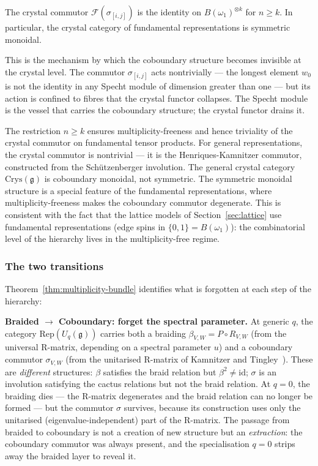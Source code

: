\begin{corollary}
\label{cor:crystal-trivial}
The crystal commutor $\mathcal{F}(\sigma_{[i,j]})$ is the identity on
$B(\omega_1)^{\otimes k}$ for $n \geq k$.  In particular, the crystal
category of fundamental representations is symmetric monoidal.
\end{corollary}

\noindent
This is the mechanism by which the coboundary structure becomes
invisible at the crystal level.  The commutor $\sigma_{[i,j]}$ acts
nontrivially --- the longest element $w_0$ is not the identity in
any Specht module of dimension greater than one --- but its action
is confined to fibres that the crystal functor collapses.  The Specht
module is the vessel that carries the coboundary structure; the crystal
functor drains it.

\begin{remark}
The restriction $n \geq k$ ensures multiplicity-freeness and hence
triviality of the crystal commutor on fundamental tensor products.
For general representations, the crystal commutor is nontrivial --- it
is the Henriques-Kamnitzer commutor, constructed from the
Sch\"utzenberger involution.  The general crystal category
$\mathrm{Crys}(\mathfrak{g})$ is coboundary monoidal, not symmetric.
The symmetric monoidal structure is a special feature of the
fundamental representations, where multiplicity-freeness makes the
coboundary commutor degenerate.  This is consistent with the fact that
the lattice models of Section~\ref{sec:lattice} use fundamental
representations (edge spins in $\{0,1\} = B(\omega_1)$): the
combinatorial level of the hierarchy lives in the multiplicity-free
regime.
\end{remark}

\subsubsection*{The two transitions}

Theorem~\ref{thm:multiplicity-bundle} identifies what is forgotten at
each step of the hierarchy:

\medskip
\noindent
\textbf{Braided $\to$ Coboundary: forget the spectral parameter.}
At generic $q$, the category $\mathrm{Rep}(U_q(\mathfrak{g}))$ carries
both a braiding $\beta_{V,W} = P \circ R_{V,W}$ (from the universal
R-matrix, depending on a spectral parameter $u$) and a coboundary
commutor $\sigma_{V,W}$ (from the unitarised R-matrix of Kamnitzer and
Tingley~\cite{kamnitzer-tingley-2007}).  These are \emph{different}
structures: $\beta$ satisfies the braid relation but $\beta^2 \neq
\mathrm{id}$; $\sigma$ is an involution satisfying the cactus relations
but not the braid relation.  At $q = 0$, the braiding dies --- the
R-matrix degenerates and the braid relation can no longer be formed ---
but the commutor $\sigma$ survives, because its construction uses only
the unitarised (eigenvalue-independent) part of the R-matrix.  The
passage from braided to coboundary is not a creation of new structure
but an \emph{extraction}: the coboundary commutor was always present,
and the specialisation $q = 0$ strips away the braided layer to
reveal it.

